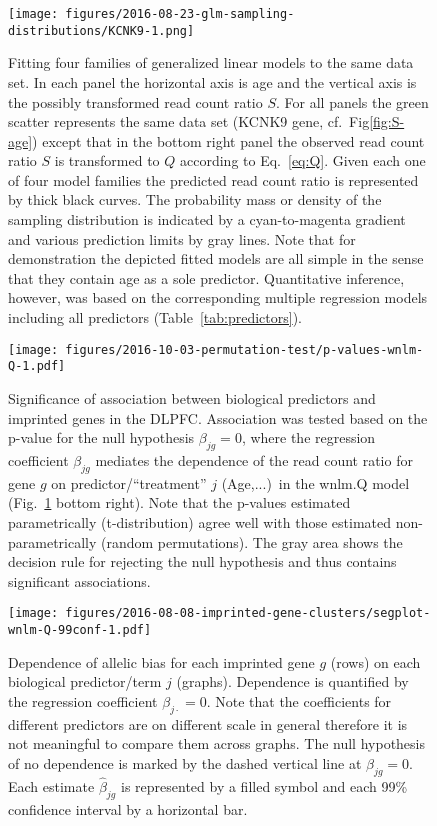 \documentclass[12pt,letterpaper]{article}
\begin{document}
\begin{figure}[h]
\begin{center}
\texttt{[image: figures/2016-08-23-glm-sampling-distributions/KCNK9-1.png]}
\end{center}
\caption{Fitting four families of generalized linear models to the same data
set.  In each panel the horizontal axis is age and the vertical axis is the
possibly transformed read count ratio \(S\).  For all panels the green scatter
represents the same data set (KCNK9 gene, cf.~Fig\ref{fig:S-age})
except that in the bottom right panel the observed read count ratio \(S\) is
transformed to \(Q\) according to Eq.~\ref{eq:Q}.  Given each one of four model
families the predicted read count ratio is represented by thick black curves.
The probability mass or density of the sampling distribution is indicated by a
cyan-to-magenta gradient and various prediction limits by gray lines.  Note
that for demonstration the depicted fitted models are all simple in the sense
that they contain age as a sole predictor.  Quantitative inference, however,
was based on the corresponding multiple regression models including all
predictors (Table~\ref{tab:predictors}).
  }
\label{fig:predicted-curves}
\end{figure}

\begin{figure}[h]
\begin{center}
\texttt{[image: figures/2016-10-03-permutation-test/p-values-wnlm-Q-1.pdf]}
\end{center}
\caption{
Significance of association between biological predictors and imprinted genes
in the DLPFC.  Association was tested based on the p-value for the null
hypothesis \(\beta_{jg}=0\), where the regression coefficient \(\beta_{jg}\)
mediates the dependence of the read count ratio for gene \(g\) on
predictor/``treatment'' \(j\) (Age,...)~in the wnlm.Q model
(Fig.~\ref{fig:predicted-curves} bottom right).  Note that the p-values
estimated parametrically (t-distribution) agree well with those estimated
non-parametrically (random permutations).  The gray area shows the decision
rule for rejecting the null hypothesis and thus contains significant
associations.
}
\label{fig:pval-wnlm.Q}
\end{figure}

\begin{figure}[h]
\begin{center}
\texttt{[image: figures/2016-08-08-imprinted-gene-clusters/segplot-wnlm-Q-99conf-1.pdf]}
\end{center}
\caption{ 
Dependence of allelic bias for each imprinted gene \(g\) (rows)
on each biological predictor/term \(j\) (graphs).  Dependence is quantified by the regression coefficient
\(\beta_{j\cdot} = 0\).  Note that the coefficients for different predictors
are on different scale in general therefore it is not meaningful to compare them across
graphs.  The null hypothesis of no dependence is marked by the dashed
vertical line at \(\beta_{jg}=0\).  Each estimate \(\hat{\beta}_{jg}\) is
represented by a filled symbol and each 99\% confidence interval by a horizontal
bar.
}
\label{fig:biol-effects-wnlm.Q}
\end{figure}
\end{document}
